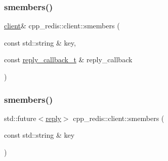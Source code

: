 \mbox{\label{classcpp__redis_1_1client_a83458f3cff3680410d34f263cd9f30bc}} 
\subsubsection{\texorpdfstring{smembers()}{smembers()}\hspace{0.1cm}{\footnotesize\ttfamily [1/2]}}
{\footnotesize\ttfamily \hyperlink{classcpp__redis_1_1client}{client}\& cpp\+\_\+redis\+::client\+::smembers (\begin{DoxyParamCaption}\item[{const std\+::string \&}]{key,  }\item[{const \hyperlink{classcpp__redis_1_1client_a061a1140d36d2eaeda82b09a0bb3f9f2}{reply\+\_\+callback\+\_\+t} \&}]{reply\+\_\+callback }\end{DoxyParamCaption})}

\mbox{\label{classcpp__redis_1_1client_a4cdd71bfb45eb37c593d6733ba83f09a}} 
\subsubsection{\texorpdfstring{smembers()}{smembers()}\hspace{0.1cm}{\footnotesize\ttfamily [2/2]}}
{\footnotesize\ttfamily std\+::future$<$\hyperlink{classcpp__redis_1_1reply}{reply}$>$ cpp\+\_\+redis\+::client\+::smembers (\begin{DoxyParamCaption}\item[{const std\+::string \&}]{key }\end{DoxyParamCaption})}

\mbox{\label{classcpp__redis_1_1client_a0768130822a976cfa3e27310c7a14417}} 
